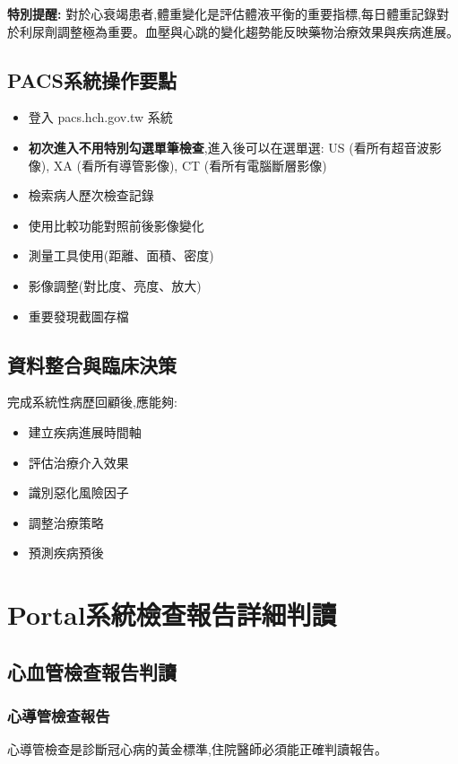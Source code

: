 \documentclass[12pt,a4paper]{article}
\begin{document}
\begin{importantbox}
\textbf{特別提醒:} 對於心衰竭患者,體重變化是評估體液平衡的重要指標,每日體重記錄對於利尿劑調整極為重要。血壓與心跳的變化趨勢能反映藥物治療效果與疾病進展。
\end{importantbox}

\subsection{PACS系統操作要點}
\begin{itemize}[nosep]
    \item 登入 pacs.hch.gov.tw 系統
    \item \textbf{初次進入不用特別勾選單筆檢查},進入後可以在選單選: US (看所有超音波影像), XA (看所有導管影像), CT (看所有電腦斷層影像)
    \item 檢索病人歷次檢查記錄
    \item 使用比較功能對照前後影像變化
    \item 測量工具使用(距離、面積、密度)
    \item 影像調整(對比度、亮度、放大)
    \item 重要發現截圖存檔
\end{itemize}

\subsection{資料整合與臨床決策}
完成系統性病歷回顧後,應能夠:
\begin{itemize}[nosep]
    \item 建立疾病進展時間軸
    \item 評估治療介入效果
    \item 識別惡化風險因子
    \item 調整治療策略
    \item 預測疾病預後
\end{itemize}

\section{Portal系統檢查報告詳細判讀}

\subsection{心血管檢查報告判讀}

\subsubsection{心導管檢查報告}
心導管檢查是診斷冠心病的黃金標準,住院醫師必須能正確判讀報告。
\end{document}
